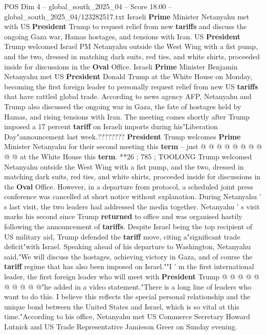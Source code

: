 \begin{textsample}{POS Dim 4 – global\_south\_2025\_04 – Score 18.00 – global\_south\_2025\_04/123282517.txt}  \label{ex:f4_pos_230}
Israeli \textbf{Prime} Minister Netanyahu met with US \textbf{President} Trump to request relief from new \textbf{tariffs} and discuss the ongoing Gaza war, Hamas hostages, and tensions with Iran.
US \textbf{President} Trump welcomed Israel PM Netanyahu outside the West Wing with a fist pump, and the two, dressed in matching dark suits, red ties, and white shirts, proceeded inside for discussions in the \textbf{Oval} Office.
Israeli \textbf{Prime} Minister Benjamin Netanyahu met US \textbf{President} Donald Trump at the White House on Monday, becoming the first foreign leader to personally request relief from new US \textbf{tariffs} that have rattled global trade.
According to news agency AFP, Netanyahu and Trump also discussed the ongoing war in Gaza, the fate of hostages held by Hamas, and rising tensions with Iran.
The meeting comes shortly after Trump imposed a 17 percent \textbf{tariff} on Israeli imports during his"Liberation Day"announcement last week.???????? \textbf{President} Trump welcomes \textbf{Prime} Minister Netanyahu for their second meeting this \textbf{term} -- just @ @ @ @ @ @ @ @ @ @ at the White House this \textbf{term}. **26 ; 785 ; TOOLONG Trump welcomed Netanyahu outside the West Wing with a fist pump, and the two, dressed in matching dark suits, red ties, and white shirts, proceeded inside for discussions in the \textbf{Oval} Office.
However, in a departure from protocol, a scheduled joint press conference was cancelled at short notice without explanation.
During Netanyahu ' s last visit, the two leaders had addressed the media together.
Netanyahu ' s visit marks his second since Trump \textbf{returned} to office and was organised hastily following the announcement of \textbf{tariffs}.
Despite Israel being the top recipient of US military aid, Trump defended the \textbf{tariff} move, citing a"significant trade deficit"with Israel.
Speaking ahead of his departure to Washington, Netanyahu said,"We will discuss the hostages, achieving victory in Gaza, and of course the \textbf{tariff} regime that has also been imposed on Israel.""I ' m the first international leader, the first foreign leader who will meet with \textbf{President} Trump @ @ @ @ @ @ @ @ @ @"he added in a video statement."There is a long line of leaders who want to do this.
I believe this reflects the special personal relationship and the unique bond between the United States and Israel, which is so vital at this time."According to his office, Netanyahu met US Commerce Secretary Howard Lutnick and US Trade Representative Jamieson Greer on Sunday evening.

\end{textsample}

